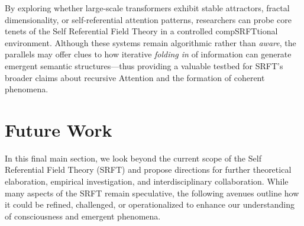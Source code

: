 \documentclass[12pt,a4paper]{article}
\begin{document}
\noindent
By exploring whether large-scale transformers exhibit stable attractors, fractal dimensionality, or self-referential attention patterns, researchers can probe core tenets of the Self Referential Field Theory in a controlled compSRFTtional environment. Although these systems remain algorithmic rather than \emph{aware}, the parallels may offer clues to how iterative \emph{folding in} of information can generate emergent semantic structures—thus providing a valuable testbed for SRFT’s broader claims about recursive Attention and the formation of coherent phenomena.



\section{Future Work}
\label{sec:future-work}

In this final main section, we look beyond the current scope of the Self Referential Field Theory (SRFT) and propose directions for further theoretical elaboration, empirical investigation, and interdisciplinary collaboration. While many aspects of the SRFT remain speculative, the following avenues outline how it could be refined, challenged, or operationalized to enhance our understanding of consciousness and emergent phenomena.
\end{document}
